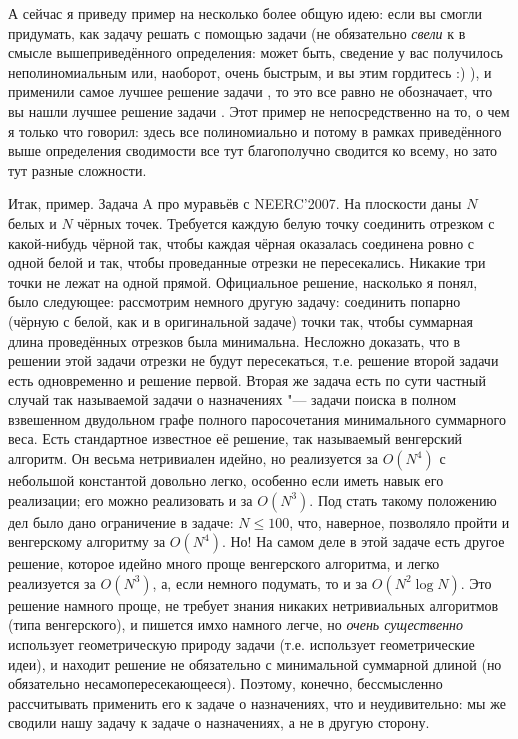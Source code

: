 {{А сейчас я приведу пример на несколько более общую идею: если вы смогли придумать, как задачу \A{} решать с помощью задачи \B{} (не 
обязательно \textit{свели} \A{} к \B{} в смысле вышеприведённого определения: может 
быть, сведение у вас получилось неполиномиальным или, наоборот, очень быстрым, и 
вы этим гордитесь :) ), и применили самое лучшее решение задачи \B, то это все равно не 
обозначает, что вы нашли лучшее решение задачи \A. Этот пример не 
непосредственно на то, о чем я только что говорил: здесь все полиномиально и 
потому в рамках приведённого выше определения сводимости все тут благополучно 
сводится ко всему, но зато тут разные сложности. 

Итак, пример. Задача A про муравьёв с NEERC'2007. На плоскости даны $N$ 
белых и $N$ чёрных точек. Требуется каждую белую точку соединить отрезком с 
какой-нибудь чёрной так, чтобы каждая чёрная оказалась соединена ровно с одной 
белой и так, чтобы проведанные отрезки не пересекались. Никакие три точки не 
лежат на одной прямой. Официальное решение, насколько я понял, было следующее: 
рассмотрим немного другую задачу: соединить попарно (чёрную с белой, как и в 
оригинальной задаче) точки так, чтобы суммарная длина проведённых отрезков была 
минимальна. Несложно доказать, что в решении этой задачи отрезки не будут 
пересекаться, т.е. решение второй задачи есть одновременно и решение первой. 
Вторая же задача есть по сути частный случай так называемой задачи о 
назначениях "--- задачи поиска в полном взвешенном двудольном графе полного 
паросочетания минимального суммарного веса. Есть стандартное известное её 
решение, так называемый венгерский алгоритм. Он весьма нетривиален идейно, но 
реализуется за $O(N^4)$ с небольшой константой довольно легко, особенно если 
иметь навык его реализации; его можно реализовать и за $O(N^3)$. Под стать такому положению дел было дано ограничение в 
задаче: $N\leq 100$, что, наверное, позволяло пройти и венгерскому алгоритму за 
$O(N^4)$. Но! На самом деле в этой задаче есть другое решение, которое идейно 
много проще венгерского алгоритма, и легко реализуется за $O(N^3)$, а, 
если немного подумать, то и за $O(N^2 \log N)$. Это решение намного проще, не 
требует знания никаких нетривиальных алгоритмов (типа венгерского), и пишется 
имхо намного легче, но \textit{очень существенно} использует геометрическую 
природу задачи (т.е. использует геометрические идеи), и находит решение не 
обязательно с минимальной суммарной длиной (но обязательно 
несамопересекающееся). Поэтому, конечно, бессмысленно рассчитывать применить 
его к задаче о назначениях, что и неудивительно: мы же сводили нашу задачу к 
задаче о назначениях, а не в другую сторону.

}}
